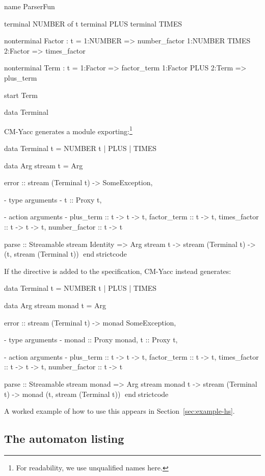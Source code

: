 \documentclass[10pt]{article}
\begin{document}
\begin{strictcode}
\begin{strictcode}
\begin{strictcode}
\begin{strictcode}
\begin{strictcode}
\begin{code}
name ParserFun

terminal NUMBER of t
terminal PLUS
terminal TIMES

nonterminal Factor : t =
  1:NUMBER => number_factor
  1:NUMBER TIMES 2:Factor => times_factor

nonterminal Term : t =
  1:Factor => factor_term
  1:Factor PLUS 2:Term => plus_term

start Term

data Terminal
\end{code}

CM-Yacc generates a module exporting:\footnote{For readability, we
use unqualified names here.}

\begin{strictcode}
data Terminal t =
   NUMBER t
 | PLUS
 | TIMES

data Arg stream t =
   Arg { error :: stream (Terminal t) -> SomeException,

         {- type arguments -}
         t :: Proxy t,

         {- action arguments -}
         plus_term :: t -> t -> t,
         factor_term :: t -> t,
         times_factor :: t -> t -> t,
         number_factor :: t -> t }

parse :: Streamable stream Identity 
         => Arg stream t -> stream (Terminal t) -> (t, stream (Terminal t))
endstrictcode

If the  directive is added to the specification, CM-Yacc
instead generates:

\begin{strictcode}
data Terminal t =
   NUMBER t
 | PLUS
 | TIMES

data Arg stream monad t =
   Arg { error :: stream (Terminal t) -> monad SomeException,

         {- type arguments -}
         monad :: Proxy monad,
         t :: Proxy t,

         {- action arguments -}
         plus_term :: t -> t -> t,
         factor_term :: t -> t,
         times_factor :: t -> t -> t,
         number_factor :: t -> t }

parse :: Streamable stream monad 
         => Arg stream monad t 
               -> stream (Terminal t) -> monad (t, stream (Terminal t))
endstrictcode

A worked example of how to use this appears in
Section~\ref{sec:example-hs}.



\subsection{The automaton listing}


\end{strictcode}
\end{strictcode}
\end{strictcode}
\end{strictcode}
\end{strictcode}
\end{strictcode}
\end{strictcode}
\end{document}
